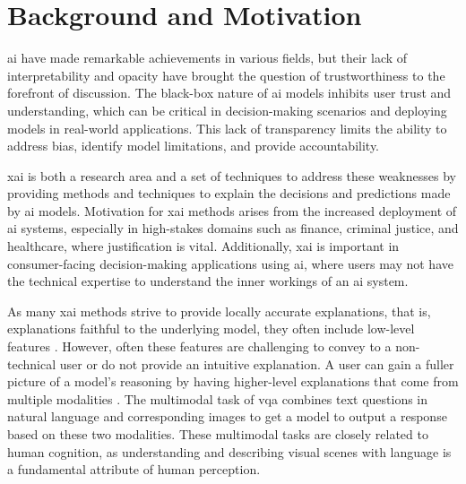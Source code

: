 \label{sec:1_1_background_and_motivation}

\begin{comment}
In about a page, summarize the most important background information. The text usually leads to YOUR PROBLEM STATEMENT (in the next section) and gives arguments about why this is a challenge today.
\end{comment}

\section{Background and Motivation}


    \gls{ai} have made remarkable achievements in various fields, but their lack of interpretability and opacity have brought the question of trustworthiness to the forefront of discussion. 
    The black-box nature of \gls{ai} models inhibits user trust and understanding, which can be critical in decision-making scenarios and deploying models in real-world applications. This lack of transparency limits the ability to address bias, identify model limitations, and provide accountability. 



    \gls{xai} is both a research area and a set of techniques to address these weaknesses by providing methods and techniques to explain the decisions and predictions made by \gls{ai} models.     
    Motivation for \gls{xai} methods arises from the increased deployment of \gls{ai} systems, especially in high-stakes domains such as finance, criminal justice, and healthcare, where justification is vital.
    Additionally, \gls{xai} is important in consumer-facing decision-making applications using \gls{ai}, where users may not have the technical expertise to understand the inner workings of an \gls{ai} system. 
   


    As many \gls{xai} methods strive to provide locally accurate explanations, that is, explanations faithful to the underlying model, they often include low-level features \cite{dasOpportunitiesChallengesExplainable2020a}. However, often these features are challenging to convey to a non-technical user or do not provide an intuitive explanation. 
    A user can gain a fuller picture of a model's reasoning by having higher-level explanations that come from multiple modalities \cite{alipourStudyMultimodalInteractive2020}.
    The multimodal task of \gls{vqa} combines text questions in natural language and corresponding images to get a model to output a response based on these two modalities. These multimodal tasks are closely related to human cognition, as understanding and describing visual scenes with language is a fundamental attribute of human perception. 
    
